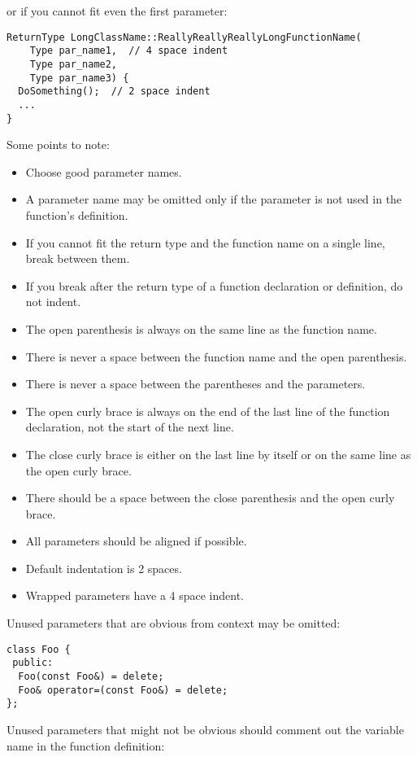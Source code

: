 or if you cannot fit even the first parameter:
\begin{verbatim}
ReturnType LongClassName::ReallyReallyReallyLongFunctionName(
    Type par_name1,  // 4 space indent
    Type par_name2,
    Type par_name3) {
  DoSomething();  // 2 space indent
  ...
}
\end{verbatim}
Some points to note:
\begin{itemize}
    \item Choose good parameter names.
    \item A parameter name may be omitted only if the parameter is not used in the function's definition.
    \item If you cannot fit the return type and the function name on a single line, break between them.
    \item If you break after the return type of a function declaration or definition, do not indent.
    \item The open parenthesis is always on the same line as the function name.
    \item There is never a space between the function name and the open parenthesis.
    \item There is never a space between the parentheses and the parameters.
    \item The open curly brace is always on the end of the last line of the function declaration, not the start of the next line.
    \item The close curly brace is either on the last line by itself or on the same line as the open curly brace.
    \item There should be a space between the close parenthesis and the open curly brace.
    \item All parameters should be aligned if possible.
    \item Default indentation is 2 spaces.
    \item Wrapped parameters have a 4 space indent.
\end{itemize}
Unused parameters that are obvious from context may be omitted:
\begin{verbatim}
class Foo {
 public:
  Foo(const Foo&) = delete;
  Foo& operator=(const Foo&) = delete;
};
\end{verbatim}
Unused parameters that might not be obvious should comment out the variable name in the function definition:
